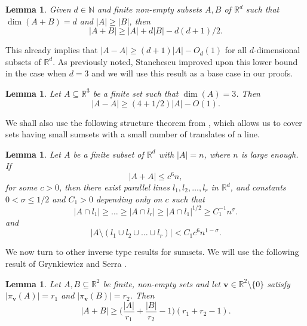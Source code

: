\documentclass[10pt]{article}
\renewcommand\vec{\bm}
\newtheorem{lemma}[theorem]{Lemma}
\numberwithin{equation}{section}
\begin{document}
 \begin{lemma} \label{1ruzsa}
Given $d \in \mathbb{N}$ and finite non-empty subsets $A, B$ of $\mathbb{R}^d$ such that $\dim(A+B) =d$ and $|A| \geq |B|$, then 
\begin{equation} \label{ruzsa4}
 |A+B| \geq |A| + d |B| - d(d+1)/2. 
 \end{equation}
 \end{lemma}
 
This already implies that $|A-A| \geq (d+1)|A| - O_{d}(1)$ for all $d$-dimensional subsets of $\mathbb{R}^d$. As previously noted, Stanchescu \cite{St1998} improved upon this lower bound in the case when $d=3$ and we will use this result as a base case in our proofs.
 
\begin{lemma} \label{stanc}
Let $A \subseteq \mathbb{R}^3$ be a finite set such that $\dim(A) = 3$. Then 
\[ |A-A| \geq (4 + 1/2) |A| - O(1). \]
\end{lemma}

We shall also use the following structure theorem from \cite{Ak2019}, which allows us to cover sets having small sumsets with a small number of translates of a line.
 
 
\begin{lemma} \label{fri}
Let $A$ be a finite subset of $\mathbb{R}^d$ with $|A| = n$, where $n$ is large enough. If
\begin{equation} \label{ti} |A+A| \leq c^6n, \end{equation}
for some $c > 0$, then there exist parallel lines $l_1, l_2, \dots, l_r$ in $\mathbb{R}^d$, and constants $0 < \sigma \leq 1/2$ and $C_1 > 0$ depending only on $c$ such that 
\[ |A \cap l_1| \geq \dots \geq  |A \cap l_r| \geq  |A \cap l_1|^{1/2} \geq C_1^{-1} n^{\sigma}. \]
and 
\[ |A\setminus (l_1 \cup l_2 \cup \dots \cup l_r)| < C_1 c^6 n^{1-\sigma}. \] 

\end{lemma}

We now turn to other inverse type results for sumsets. We will use the following result of Grynkiewicz and Serra \cite[Theorem 1.3]{GS2010}.

\begin{lemma} \label{gsne2}
Let $A, B \subseteq \mathbb{R}^2$ be finite, non-empty sets and let $\vec{v} \in \mathbb{R}^2 \setminus \{0\}$ satisfy $|\pi_{\vec{v}}(A)| = r_1$ and $|\pi_{\vec{v}}(B)| = r_2$. Then
\begin{equation}  \label{gs1}
 |A+B| \geq \bigg( \frac{|A|}{r_1} + \frac{|B|}{r_2} - 1 \bigg)  (r_1 + r_2 - 1). 
\end{equation}
\end{lemma}
\end{document}
